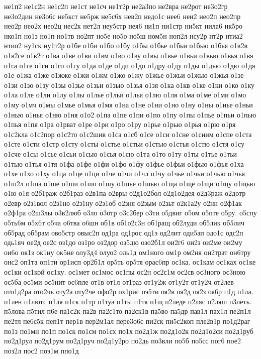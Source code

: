 {не1п2
не1с2н
не1с2п
не1ст
не1сч
не1т2р
не2а3по
не2вра
не2рот
не3о2гр
не3о2дин
не3о6с
не5кст
не5рж
не5с6х
нев2п
недо1с
нее6
неи2
нео2п
нео2пр
нео2р
нео2х
нео2ц
нес2к
нет2л
неу5стр
нея6
ни1п
ни1стр
ни5кт
нила6
нк5ро
нко1п
но1з
но1п
но1тв
но2пт
но5е
но5о
но5ш
ном5н
ноп2л
нсу2р
нт2р
нтиа2
нтио2
ну1ск
ну1т2р
о1бе
о1би
о1бо
о1бу
о1бы
о1бье
о1бьи
о1бью
о1бья
о1в2в
о1в2се
о1в2т
о1ва
о1ве
о1ви
о1вм
о1во
о1ву
о1вы
о1вье
о1вьи
о1вью
о1вья
о1вя
о1га
о1ге
о1ги
о1го
о1гу
о1да
о1де
о1ди
о1до
о1дру
о1ду
о1ды
о1дью
о1дю
о1дя
о1е
о1жа
о1же
о1жже
о1жи
о1жм
о1жо
о1жу
о1жье
о1жьи
о1жью
о1жья
о1зе
о1зи
о1зо
о1зу
о1зы
о1зье
о1зьи
о1зью
о1зья
о1зя
о1ка
о1кв
о1ке
о1ки
о1ко
о1ку
о1ла
о1ле
о1ли
о1лу
о1лы
о1лье
о1льи
о1лья
о1лю
о1ля
о1ма
о1ме
о1ми
о1мо
о1му
о1мч
о1мы
о1мье
о1мья
о1мя
о1на
о1не
о1ни
о1но
о1ну
о1ны
о1нье
о1ньи
о1нью
о1нья
о1ню
о1ня
о1о2
о1па
о1пе
о1пи
о1по
о1пу
о1пы
о1пье
о1пьи
о1пью
о1пья
о1пя
о1ра
о1рват
о1ре
о1ри
о1ро
о1ру
о1рье
о1рью
о1рья
о1рю
о1ря
о1с2кла
о1с2пор
о1с2то
о1с2шив
о1са
о1сб
о1се
о1си
о1сне
о1сним
о1спе
о1ста
о1сте
о1сти
о1стр
о1сту
о1сты
о1стье
о1стьи
о1стью
о1стья
о1стю
о1стя
о1су
о1сче
о1сы
о1сье
о1сьи
о1сью
о1сья
о1сю
о1та
о1то
о1ту
о1ты
о1тье
о1тьи
о1тью
о1тья
о1тя
о1фа
о1фе
о1фи
о1фо
о1фу
о1фье
о1фьи
о1фью
о1фья
о1ха
о1хе
о1хо
о1ху
о1ца
о1це
о1ци
о1че
о1чи
о1чл
о1чу
о1чье
о1чьи
о1чью
о1чья
о1ш2л
о1ша
о1ше
о1ши
о1шо
о1шу
о1шье
о1шью
о1ща
о1ще
о1щи
о1щу
о1щью
о1ю
о1я
о2б1раж
о2б1раз
о2в1па
о2вры
о2д1о2бол
о2д1о2дея
о2д3раж
о2дотр
о2евр
о2з1вол
о2з1но
о2з1ну
о2з1об
о2зня
о2зым
о2зьт
о2к1а2у
о2нн
о2ф1ак
о2ф1ра
о2ш3лы
о3в2люб
о3ло
о3отр
о3с2бер
о3ти
о5двиг
о5ом
о5пте
о5ру.
о5спу
о5ть6м
о5х6т
о5ча
о6тва
о6шн
об1в
об1о2с3н
об1ращ
об2луди
об5лик
об5лич
об5рад
об5рам
ово5стр
овыс2п
од1ра
од1рос
од1э
од2лит
оди5ап
одо1с
одс2п
одь1яч
ое2д
ое2с
оз1до
оз1ро
оз2дор
оз5дю
озо2б1л
ои2г6
ои2з
ои2ме
ои2му
ои6о
ок1з
ок1ну
ок5не
олу3д4
олуо2
оль1д
ом1ного
ом1р
ом2ня
он2трат
он6тру
онс2
оп1та
оп1ти
ор1исп
ор2б1л
ор5ть
ор5тя
орас6пр
ос1ка.
ос1кам
ос1ках
ос1ке
ос1ки
ос1кой
ос1ку.
ос1мет
ос1мос
ос1пы
ос2н
ос2с1м
ос2св
ос3ного
ос3ною
ос5ба
ос5ми
ос5нит
ос6пле
от1в
от1л
от1раз
от1у2ж
от1у2т
от1у2ч
от2лев
ото1д2ра
ото2чь
оту2а
оту2че
офо2р
ох1рис
оэ5ти
оя2в
оя2д
оя2з
оя6р
п1д
п1ла.
п1лен
п1лютс
п1ля
п1ск
п1тр
п1туа
п1ты
п1тя
п1щ
п2леде
п2ляс
п2ляш
п3леть.
п5лова
п5тил
п6е
па1с2к
па2в
па2с1то
па2ск1в
па5во
па5др
пав1л
пах1л
пе2п1л
пе2тл
пе6с5к
пеп1т
пер1в
пер2м1ал
пере3о6с
пи2ск
пи5с2коп
пле2в1р
по1д2раг
по1з
по1мн
по1п
по1ск
по1см
по1сх
по1х
по2д1ж
по2д1о2к
по2д1о2си
по2д1руб
по2д1рул
по2д1рум
по2д1руч
по2д1у2ро
по2дь
по3вли
по5б
по5сс
пог6
пое2
поз2л
пос2
поэ1м
ппо1д
}
